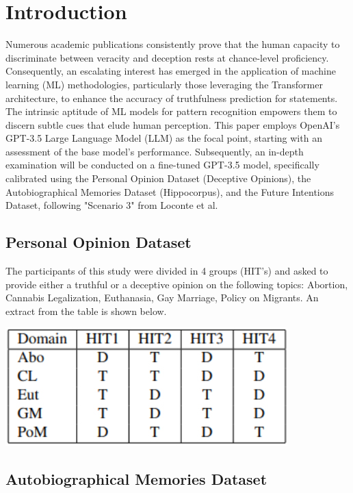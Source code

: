 \documentclass[10pt,twocolumn,letterpaper]{article}
\begin{document}
\section{Introduction}
Numerous academic publications consistently prove that the human capacity to discriminate 
between veracity and deception rests at chance-level proficiency. Consequently, an escalating 
interest has emerged in the application of machine learning (ML) methodologies, particularly 
those leveraging the Transformer architecture, to enhance the accuracy of truthfulness prediction for statements. 
The intrinsic aptitude of ML models for pattern recognition empowers them to discern subtle cues 
that elude human perception. This paper employs OpenAI's GPT-3.5 Large Language Model (LLM) 
as the focal point, starting with an assessment of the base model's performance. Subsequently, 
an in-depth examination will be conducted on a fine-tuned GPT-3.5 model, specifically calibrated using the 
Personal Opinion Dataset (Deceptive Opinions), the Autobiographical Memories Dataset (Hippocorpus), and the 
Future Intentions Dataset, following "Scenario 3" from Loconte et al.\cite{Loconte} \\

\subsection{Personal Opinion Dataset}

The participants of this study were divided in 4 groups (HIT’s) and asked to provide either 
a truthful or a deceptive opinion on the following topics: Abortion, Cannabis Legalization, Euthanasia, Gay Marriage, Policy on Migrants.
An extract from the table is shown below. \\

\begin{center}
\includegraphics[scale=0.45]{img/pers_op_dataset.jpg} \\
\end{center}

\subsection{Autobiographical Memories Dataset}
\end{document}
